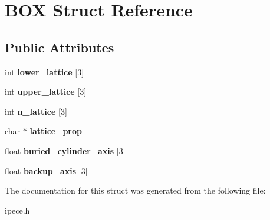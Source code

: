\hypertarget{struct_b_o_x}{\section{B\-O\-X Struct Reference}
\label{struct_b_o_x}
}
\subsection*{Public Attributes}
\begin{DoxyCompactItemize}
\item 
\hypertarget{struct_b_o_x_afae3b0a438e711ca17283ff159278293}{int {\bfseries lower\-\_\-lattice} \mbox{[}3\mbox{]}}\label{struct_b_o_x_afae3b0a438e711ca17283ff159278293}

\item 
\hypertarget{struct_b_o_x_a56fffcc9b9303f871bd60da6bef0ce55}{int {\bfseries upper\-\_\-lattice} \mbox{[}3\mbox{]}}\label{struct_b_o_x_a56fffcc9b9303f871bd60da6bef0ce55}

\item 
\hypertarget{struct_b_o_x_a57dde64cd0541649ee592d50f23271d8}{int {\bfseries n\-\_\-lattice} \mbox{[}3\mbox{]}}\label{struct_b_o_x_a57dde64cd0541649ee592d50f23271d8}

\item 
\hypertarget{struct_b_o_x_ae0c4a71d6e2c71060d133e6a3f70e646}{char $\ast$ {\bfseries lattice\-\_\-prop}}\label{struct_b_o_x_ae0c4a71d6e2c71060d133e6a3f70e646}

\item 
\hypertarget{struct_b_o_x_a6da6dce862a6438fb880552c177e3856}{float {\bfseries buried\-\_\-cylinder\-\_\-axis} \mbox{[}3\mbox{]}}\label{struct_b_o_x_a6da6dce862a6438fb880552c177e3856}

\item 
\hypertarget{struct_b_o_x_aee83808fcc400e96edeb03d4a9e99a57}{float {\bfseries backup\-\_\-axis} \mbox{[}3\mbox{]}}\label{struct_b_o_x_aee83808fcc400e96edeb03d4a9e99a57}

\end{DoxyCompactItemize}


The documentation for this struct was generated from the following file\-:\begin{DoxyCompactItemize}
\item 
ipece.\-h\end{DoxyCompactItemize}
